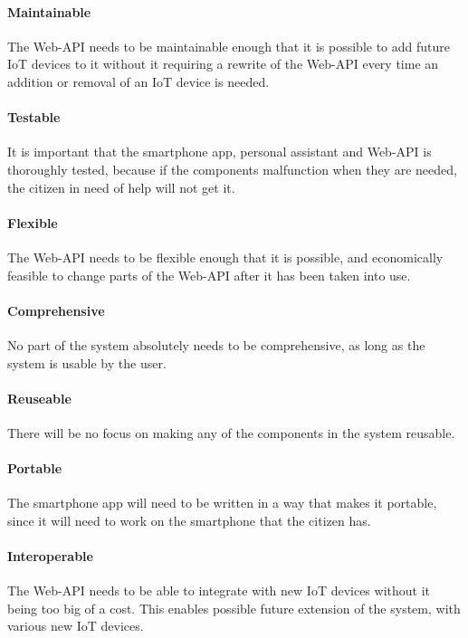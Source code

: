 \paragraph{Maintainable}
The Web-API needs to be maintainable enough that it is possible to add future IoT devices to it without it requiring a rewrite of the Web-API every time an addition or removal of an IoT device is needed.

\paragraph{Testable}
It is important that the smartphone app, personal assistant and Web-API is thoroughly tested, because if the components malfunction when they are needed, the citizen in need of help will not get it.

\paragraph{Flexible}
The Web-API needs to be flexible enough that it is possible, and economically feasible to change parts of the Web-API after it has been taken into use.

\paragraph{Comprehensive}
No part of the system absolutely needs to be comprehensive, as long as the system is usable by the user.

\paragraph{Reuseable}
There will be no focus on making any of the components in the system reusable.

\paragraph{Portable}
The smartphone app will need to be written in a way that makes it portable, since it will need to work on the smartphone that the citizen has. 

\paragraph{Interoperable}
The Web-API needs to be able to integrate with new IoT devices without it being too big of a cost. This enables possible future extension of the system, with various new IoT devices.

